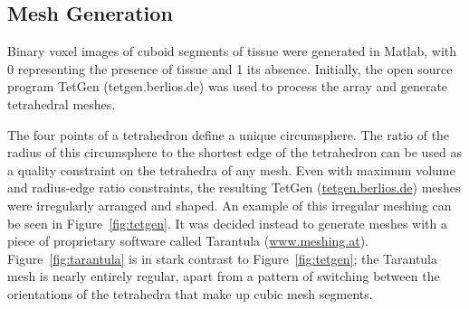 \subsection{Mesh Generation} %
\label{sec:mesh_generation}
  Binary voxel images of cuboid segments of tissue were generated in Matlab, with 0 representing the presence of tissue and 1 its absence. Initially, the open source program TetGen (tetgen.berlios.de) was used to process the array and generate tetrahedral meshes.
  
  The four points of a tetrahedron define a unique circumsphere. The ratio of the radius of this circumsphere to the shortest edge of the tetrahedron can be used as a quality constraint on the tetrahedra of any mesh. Even with maximum volume and radius-edge ratio constraints, the resulting TetGen (\url{tetgen.berlios.de}) meshes were irregularly arranged and shaped. An example of this irregular meshing can be seen in Figure~\ref{fig:tetgen}. It was decided instead to generate meshes with a piece of proprietary software called Tarantula (\url{www.meshing.at}). Figure~\ref{fig:tarantula} is in stark contrast to Figure~\ref{fig:tetgen}; the Tarantula mesh is nearly entirely regular, apart from a pattern of switching between the orientations of the tetrahedra that make up cubic mesh segments.
  
